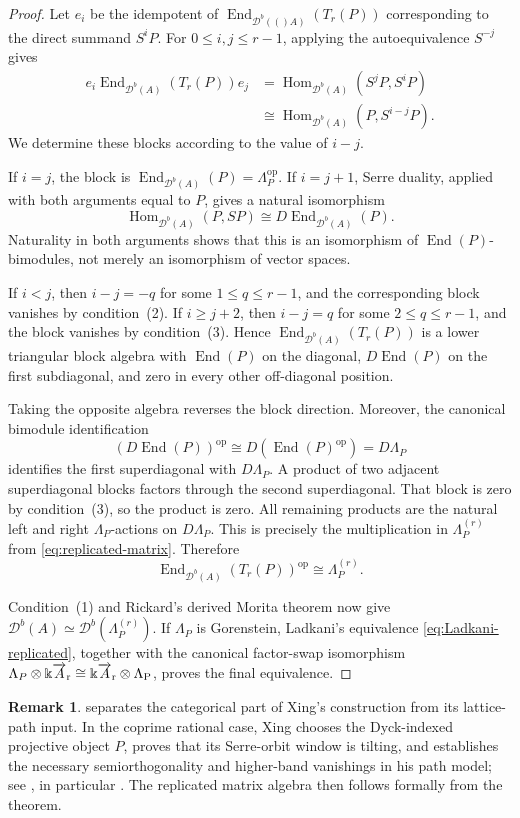 \documentclass[12pt,a4paper,english,reqno]{amsart}
\theoremstyle{plain}
\theoremstyle{definition}
\newtheorem{remark}[theorem]{Remark}
\newcommand{\kk}{\Bbbk}
\newcommand{\Hom}{\operatorname{Hom}}
\newcommand{\End}{\operatorname{End}}
\newcommand{\op}{\mathrm{op}}
\newcommand{\Db}[1]{{\mathscr D}^b(#1)}
\newcommand{\ovr}{\rm \overrightarrow}
\begin{document}
\begin{proof}
Let $e_i$ be the idempotent of
$\End_{\Db(A)}(T_r(P))$ corresponding to the direct summand $S^iP$.
For $0\leq i,j\leq r-1$, applying the autoequivalence $S^{-j}$ gives
\[
\begin{split}
 e_i\End_{\Db{A}}(T_r(P))e_j
 &=
 \Hom_{\Db{A}}(S^jP,S^iP)\\
 &\cong
 \Hom_{\Db{A}}(P,S^{i-j}P).
\end{split}
\]
We determine these blocks according to the value of $i-j$.

If $i=j$, the block is $\End_{\Db{A}}(P)=\Lambda_P^{\op}$.
If $i=j+1$, Serre duality, applied with both arguments equal to $P$,
gives a natural isomorphism
\[
 \Hom_{\Db{A}}(P,SP)
 \cong D\End_{\Db{A}}(P).
\]
Naturality in both arguments shows that this is an isomorphism of
$\End(P)$-bimodules, not merely an isomorphism of vector spaces.

If $i<j$, then $i-j=-q$ for some $1\leq q\leq r-1$, and the
corresponding block vanishes by condition~(2).  If $i\geq j+2$, then
$i-j=q$ for some $2\leq q\leq r-1$, and the block vanishes by
condition~(3).  Hence $\End_{\Db{A}}(T_r(P))$ is a lower triangular block
algebra with $\End(P)$ on the diagonal,
$D\End(P)$ on the first subdiagonal, and zero in every other
off-diagonal position.

Taking the opposite algebra reverses the block direction.  Moreover, the
canonical bimodule identification
\[
(D\End(P))^{\op}
 \cong D(\End(P)^{\op})
 =D\Lambda_P
\]
identifies the first superdiagonal with $D\Lambda_P$.  A product of two
adjacent superdiagonal blocks factors through the second superdiagonal.
That block is zero by condition~(3), so the product is zero.  All remaining
products are the natural left and right $\Lambda_P$-actions on
$D\Lambda_P$.  This is precisely the multiplication in
$\Lambda_P^{(r)}$ from \eqref{eq:replicated-matrix}.  Therefore
\[
 \End_{\Db{A}}(T_r(P))^{\op}\cong\Lambda_P^{(r)}.
\]

Condition~(1) and Rickard's derived Morita theorem now give
$\Db{A}\simeq\Db{\Lambda_P^{(r)}}$.  If $\Lambda_P$ is Gorenstein,
Ladkani's equivalence \eqref{eq:Ladkani-replicated}, together with the
canonical factor-swap isomorphism
$\Lambda_P\otimes\kk\ovr A_r\cong
\kk\ovr A_r\otimes\Lambda_P$, proves the final equivalence.
\end{proof}

\begin{remark}
\label{rem:Xing-vanishing-mechanism}
 separates the categorical part of Xing's
construction from its lattice-path input.  In the coprime rational case,
Xing chooses the Dyck-indexed projective object $P$, proves that its
Serre-orbit window is tilting, and establishes the necessary
semiorthogonality and higher-band vanishings in his path model; see
\cite[Theorem~4.5 and Section~4.4]{Xing}, in particular
\cite[Proposition~4.17 and Corollary~4.21]{Xing}.  The replicated matrix
algebra then follows formally from the theorem.
\end{remark}
\end{document}
